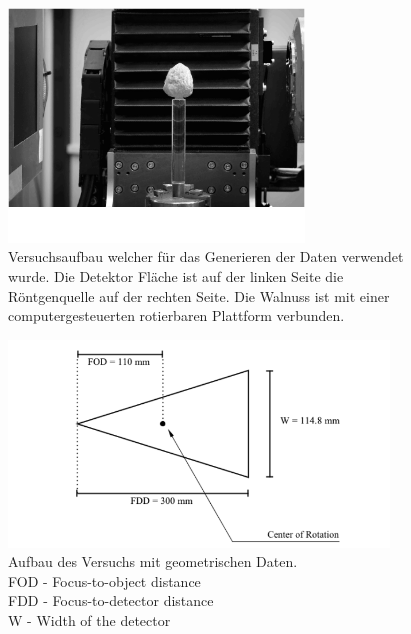 \documentclass[]{dsadokumentation}
\begin{document}
\begin{figure}
    \centering
    \includegraphics[width=0.7\textwidth]{k4.2/ctabbild.png}
    \caption{Versuchsaufbau welcher für das Generieren der Daten verwendet wurde. Die Detektor Fläche ist auf der linken Seite die Röntgenquelle auf der rechten Seite. Die Walnuss ist mit einer computergesteuerten rotierbaren Plattform verbunden.}
    \label{k4.2.fig.ctAbbild}
\end{figure}
\begin{figure}
    \centering
    \includegraphics[width=0.9\textwidth]{k4.2/geometry.png}
    \caption{Aufbau des Versuchs mit geometrischen Daten.\\
    FOD - Focus-to-object distance\\
    FDD - Focus-to-detector distance\\
    W - Width of the detector
    }
    \label{k4.2.fig.Geo}
\end{figure}
\end{document}
